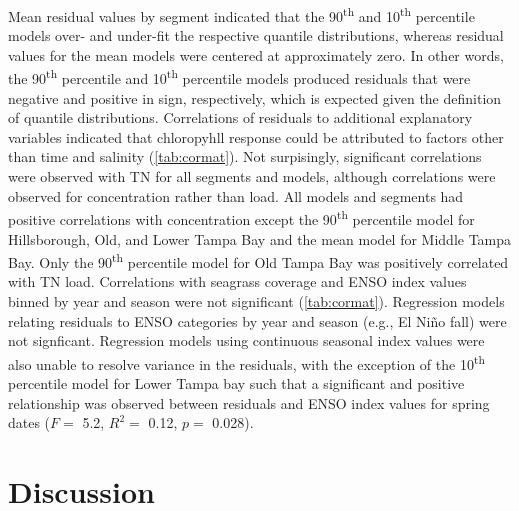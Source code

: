 \documentclass{svjour3}\usepackage[]{graphicx}\usepackage[]{color}
\newcommand{\nine}{90\textsuperscript{th} percentile }
\newcommand{\ten}{10\textsuperscript{th} percentile }
\begin{document}
Mean residual values by segment indicated that the 90\textsuperscript{th} and \ten models over- and under-fit the respective quantile distributions, whereas residual values for the mean models were centered at approximately zero.  In other words, the \nine and \ten models produced residuals that were negative and positive in sign, respectively, which is expected given the definition of quantile distributions.  Correlations of residuals to additional explanatory variables indicated that chloropyhll response could be attributed to factors other than time and salinity (\cref{tab:cormat}). Not surpisingly, significant correlations were observed with \ac{TN} for all segments and models, although correlations were observed for concentration rather than load.  All models and segments had positive correlations with concentration except the \nine model for Hillsborough, Old, and Lower Tampa Bay and the mean model for Middle Tampa Bay.  Only the \nine model for Old Tampa Bay was positively correlated with \ac{TN} load.  Correlations with seagrass coverage and \ac{ENSO} index values binned by year and season were not significant (\cref{tab:cormat}).  Regression models relating residuals to \ac{ENSO} categories by year and season (e.g., El Ni\~{n}o fall) were not signficant.  Regression models using continuous seasonal index values were also unable to resolve variance in the residuals, with the exception of the \ten model for Lower Tampa bay such that a significant and positive relationship was observed between residuals and \ac{ENSO} index values for spring dates ($F=$ 5.2, $R^2 =$ 0.12, $p=$ 0.028).  

\section{Discussion}
\end{document}
